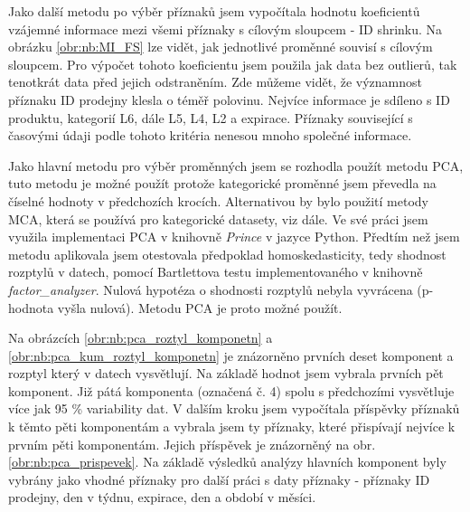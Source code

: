 Jako další metodu po výběr příznaků jsem vypočítala hodnotu koeficientů vzájemné informace mezi všemi příznaky s cílovým sloupcem - ID shrinku. Na obrázku \ref*{obr:nb:MI_FS} lze vidět, jak jednotlivé proměnné souvisí s cílovým sloupcem. Pro výpočet tohoto koeficientu jsem použila jak data bez outlierů, tak tenotkrát data před jejich odstraněním. Zde můžeme vidět, že významnost příznaku ID prodejny klesla o téměř polovinu. Nejvíce informace je sdíleno s ID produktu, kategorií L6, dále L5, L4, L2 a expirace. Příznaky související s časovými údaji podle tohoto kritéria nenesou mnoho společné informace.

Jako hlavní metodu pro výběr proměnných jsem se rozhodla použít metodu PCA, tuto metodu je možné použít protože kategorické proměnné jsem převedla na číselné hodnoty v předchozích krocích. Alternativou by bylo použití metody MCA, která se používá pro kategorické datasety, viz dále.
Ve své práci jsem využila implementaci PCA v knihovně \emph{Prince} v jazyce Python. 
Předtím než jsem metodu aplikovala jsem otestovala předpoklad homoskedasticity, tedy shodnost rozptylů v datech, pomocí Bartlettova testu implementovaného v knihovně \emph{factor\_analyzer}. Nulová hypotéza o shodnosti rozptylů nebyla vyvrácena (p-hodnota vyšla nulová). Metodu PCA je proto možné použít.

Na obrázcích \ref*{obr:nb:pca_roztyl_komponetn} a \ref*{obr:nb:pca_kum_roztyl_komponetn} je znázorněno prvních deset komponent a rozptyl který v datech vysvětlují. Na základě hodnot jsem vybrala prvních pět komponent. Již pátá komponenta (označená č. 4) spolu s předchozími vysvětluje více jak 95 \% variability dat. V dalším kroku jsem vypočítala příspěvky příznaků k těmto pěti komponentám a vybrala jsem ty příznaky, které přispívají nejvíce k prvním pěti komponentám. Jejich příspěvek je znázorněný na obr. \ref*{obr:nb:pca_prispevek}. Na základě výsledků analýzy hlavních komponent byly vybrány jako vhodné příznaky pro další práci s daty příznaky - příznaky ID prodejny, den v týdnu, expirace, den a období v měsíci.

